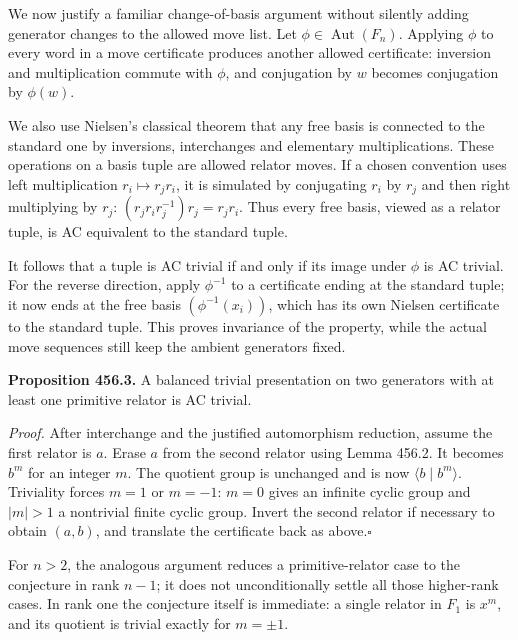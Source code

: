 \documentclass[11pt]{article}
\begin{document}
We now justify a familiar change-of-basis argument without silently
adding generator changes to the allowed move list. Let
$\phi\in\operatorname{Aut}(F_n)$. Applying $\phi$ to every word
in a move certificate produces another allowed certificate: inversion
and multiplication commute with $\phi$, and conjugation by $w$
becomes conjugation by $\phi(w)$.

We also use Nielsen's classical theorem that any free basis is connected
to the standard one by inversions, interchanges and elementary
multiplications. These operations on a basis tuple are allowed
relator moves. If a chosen convention uses left multiplication
$r_i\mapsto r_jr_i$, it is simulated by conjugating $r_i$ by $r_j$
and then right multiplying by $r_j$:
$(r_jr_ir_j^{-1})r_j=r_jr_i$.
Thus every free basis, viewed as a relator tuple, is AC equivalent
to the standard tuple.

It follows that a tuple is AC trivial if and only if its image under
$\phi$ is AC trivial. For the reverse direction, apply $\phi^{-1}$
to a certificate ending at the standard tuple; it now ends at the
free basis $(\phi^{-1}(x_i))$, which has its own Nielsen certificate
to the standard tuple. This proves invariance of the property, while
the actual move sequences still keep the ambient generators fixed.

\textbf{Proposition 456.3.} A balanced trivial presentation on two
generators with at least one primitive relator is AC trivial.

\emph{Proof.}
After interchange and the justified automorphism reduction, assume
the first relator is $a$. Erase $a$ from the second relator using
Lemma 456.2. It becomes $b^m$ for an integer $m$.
The quotient group is unchanged and is now
$\langle b\mid b^m\rangle$. Triviality forces $m=1$ or $m=-1$:
$m=0$ gives an infinite cyclic group and $|m|>1$ a nontrivial finite
cyclic group. Invert the second relator if necessary to obtain $(a,b)$,
and translate the certificate back as above.\hfill$\square$

For $n>2$, the analogous argument reduces a primitive-relator case
to the conjecture in rank $n-1$; it does not unconditionally settle
all those higher-rank cases. In rank one the conjecture itself is
immediate: a single relator in $F_1$ is $x^m$, and its quotient is
trivial exactly for $m=\pm1$.
\end{document}
